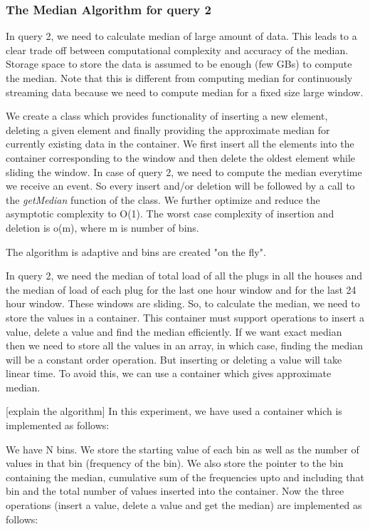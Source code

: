 \subsubsection{The Median Algorithm for query 2}
In query 2, we need to calculate median of large amount of data. This leads to a clear trade off between computational complexity and accuracy of the median. Storage space to store the data is assumed to be enough (few GBs) to compute the median. Note that this is different from computing median for continuously streaming data because we need to compute median for a fixed size large window.

We create a class which provides functionality of inserting a new element, deleting a given element and finally providing the approximate median for currently existing data in the container. We first insert all the elements into the container corresponding to the window and then delete the oldest element while sliding the window. In case of query 2, we need to compute the median everytime we receive an event. So every insert and/or deletion will be followed by a call to the \textit{getMedian} function of the class. We further optimize and reduce the asymptotic complexity to O(1). The worst case complexity of insertion and deletion is o(m), where m is number of bins.

The algorithm is adaptive and bins are created "on the fly".


In query 2, we need the median of total load of all the plugs in all the houses and the median of load of each plug for the last one hour window and for the last 24 hour window. These windows are sliding. So, to calculate the median, we need to store the values in a container. This container must support operations to insert a value, delete a value and find the median efficiently. If we want exact median then we need to store all the values in an array, in which case, finding the median will be a constant order operation. But inserting or deleting a value will take linear time. To avoid this, we can use a container which gives approximate median.


[explain the algorithm]
In this experiment, we have used a container which is implemented as follows:

We have N bins. We store the starting value of each bin as well as the number of values in that bin (frequency of the bin). We also store the pointer to the bin containing the median, cumulative sum of the frequencies upto and including that bin and the total number of values inserted into the container. Now the three operations (insert a value, delete a value and get the median) are implemented as follows:



